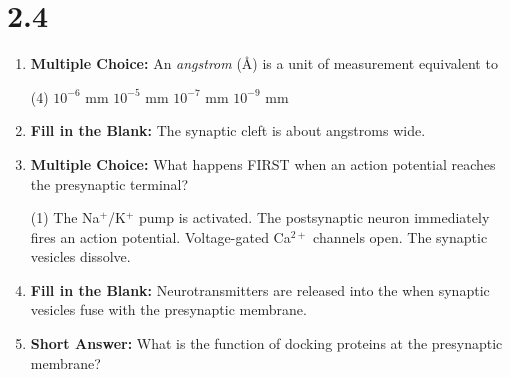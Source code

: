 \squigglyline

\section*{2.4}
\begin{enumerate}[label=\textbf{Q2.4.\arabic*}]
      
      \item \textbf{Multiple Choice:} An \textit{angstrom} (\AA) is a unit of measurement equivalent to
      \begin{tasks}[label=\textcolor{draculafg}{(\Alph*)}, item-format=\color{draculafg}, label-width=1.5em, item-indent=1.7em](4)
            \task \(10^{-6}\) mm
            \task \(10^{-5}\) mm
            \task \(10^{-7}\) mm
            \task \(10^{-9}\) mm
      \end{tasks}
      
      \item \textbf{Fill in the Blank:} The synaptic cleft is about \underline{\hspace{3cm}} angstroms wide. \\

      \item \textbf{Multiple Choice:} What happens FIRST when an action potential reaches the presynaptic terminal?
            \begin{tasks}[label=\textcolor{draculafg}{(\Alph*)}, item-format=\color{draculafg}, label-width=1.5em, item-indent=1.7em](1)
                  \task The Na\(^+\)/K\(^+\) pump is activated.
                  \task The postsynaptic neuron immediately fires an action potential.
                  \task Voltage-gated Ca\(^{2+}\) channels open.
                  \task The synaptic vesicles dissolve.
            \end{tasks}

      \item \textbf{Fill in the Blank:} Neurotransmitters are released into the \underline{\hspace{3cm}} when synaptic vesicles fuse with the presynaptic membrane. \\

      \item \textbf{Short Answer:} What is the function of docking proteins at the presynaptic membrane? \\

            
            

\end{enumerate}

